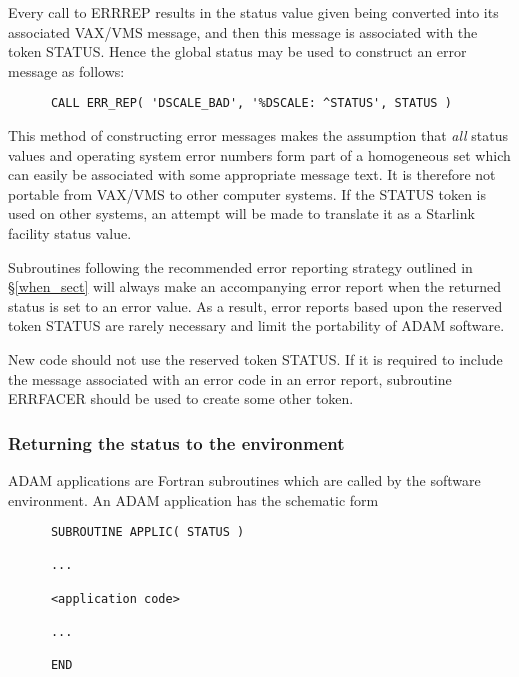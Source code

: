 \documentclass[twoside,11pt]{article}
\newcommand{\htmlref}[2]{#1}
\newcommand{\latex}[1]{#1}
\newcommand{\xlabel}[1]{}
\renewcommand{\_}{\texttt{\symbol{95}}}
\begin{document}
Every call to ERR\_REP results in the status value given being converted into
its associated VAX/VMS message, and then this message is associated with the 
token STATUS.
Hence the global status may be used to construct an error message as follows:

\begin {small}
\begin{verbatim}
      CALL ERR_REP( 'DSCALE_BAD', '%DSCALE: ^STATUS', STATUS )
\end{verbatim}
\end {small}

This method of constructing error messages makes the assumption that \emph{all}
status values and operating system error numbers form part of a homogeneous 
set which can easily be associated with some appropriate message text.
It is therefore not portable from VAX/VMS to other computer systems.
If the STATUS token is used on other systems, an attempt will be made to
translate it as a Starlink facility status value.

Subroutines following the
\htmlref{recommended error reporting strategy}{when_sect}
\latex{ outlined in \S\ref{when_sect}} will 
always make an accompanying error report when the returned status is set to an
error value.
As a result, error reports based upon the reserved token STATUS are rarely
necessary and limit the portability of ADAM software.

New code should not use the reserved token STATUS.
If it is required to include the message associated with an error code in an
error report, subroutine
\htmlref{ERR\_FACER}{ERR_FACER} should be used to create some other token.

\subsubsection{\xlabel{returning_the_status_to_the_environment}Returning the status to the environment}
ADAM applications are Fortran subroutines which are called by the software
environment. 
An ADAM application has the schematic form 
\begin {small}
\begin{verbatim}
      SUBROUTINE APPLIC( STATUS )

      ...

      <application code>

      ...

      END
\end{verbatim}
\end {small}
\end{document}
